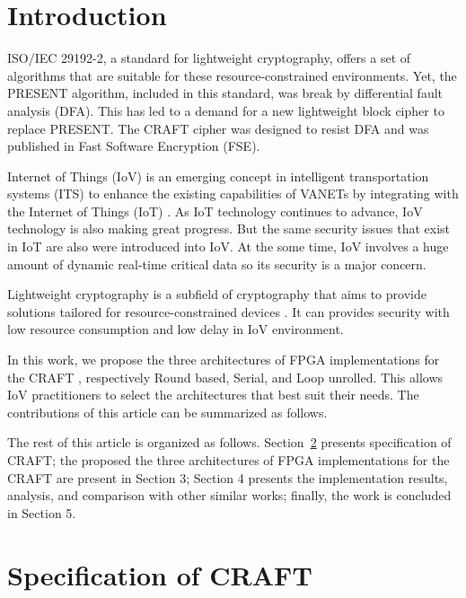 \documentclass[final,5p,times,twocolumn]{elsarticle}
\begin{document}



\section{Introduction}\label{sec1}


ISO/IEC 29192-2, a standard for lightweight cryptography, offers a set of algorithms that are suitable for these resource-constrained environments. Yet, the PRESENT algorithm, included in this standard, was break by differential fault analysis (DFA). This has led to a demand for a new lightweight block cipher to replace PRESENT. The CRAFT cipher was designed to resist DFA and was published in Fast Software Encryption (FSE).

Internet of Things  (IoV) is an emerging concept in intelligent transportation systems (ITS) to enhance the existing capabilities of VANETs by integrating with the Internet of Things (IoT) \cite{sharma2019survey}.
As IoT technology continues to advance, IoV technology is also making great progress.
But the same security issues that exist in IoT are also were introduced into IoV.
At the some time, IoV involves a huge amount of dynamic real-time critical data so its security is a major concern.

Lightweight cryptography is a subfield of cryptography that aims to provide solutions tailored for resource-constrained devices \cite{Turan}.
It can provides security with low resource consumption and low delay in IoV environment.

In this work, we propose the three architectures of FPGA implementations for the CRAFT \cite{beierle2019craft}, respectively Round based, Serial, and Loop unrolled.
This allows IoV practitioners to select the architectures that best suit their needs.
The contributions of this article can be summarized as follows.

The rest of this article is organized as follows.
Section~\ref{sec2} presents specification of CRAFT; the proposed the three architectures of FPGA implementations for the CRAFT are present in Section 3; Section 4 presents the implementation results, analysis, and comparison with other similar works; finally, the work is concluded in Section 5.

\section{Specification of CRAFT}\label{sec2}
\end{document}
